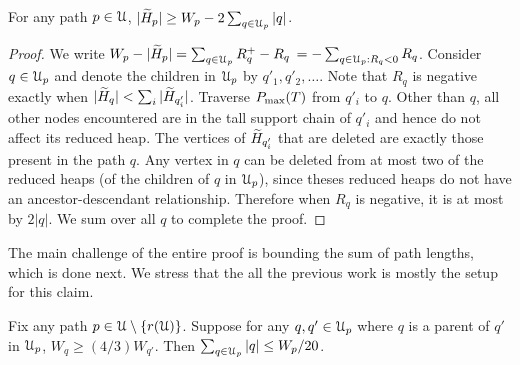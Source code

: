 {\begin{claim} \label{clm:loss} For any path $p\in {\cal U}$, $|\widetilde{H}_p| \geq W_p - 2\sum_{q \in {\cal U}_p} |q|$.
\end{claim}

\begin{proof} We write $W_p - |\widetilde{H}_p| = \sum_{q \in {\cal U}_p} R^+_q - R_q$ $= -\sum_{q \in {\cal U}_p: R_q < 0} R_q$.
Consider $q \in {\cal U}_p$ and denote the children in ${\cal U}_p$ by $q'_1, q'_2, \ldots$.
Note that $R_q$ is negative exactly when $|\widetilde{H}_q| < \sum_i |\widetilde{H}_{q'_i}|$.
Traverse $P_{\max}(T)$ from $q'_i$ to $q$.
Other than $q$, all other nodes encountered are in the tall support chain of $q'_i$ and hence
do not affect its reduced heap.
The vertices of $\widetilde{H}_{q'_i}$ that are deleted
are exactly those present in the path $q$. 
Any vertex in $q$ can be deleted from at most two of the reduced heaps (of the children of $q$ in ${\cal U}_p$), since 
theses reduced heaps do not have an ancestor-descendant relationship.
Therefore when $R_q$ is negative, it is at most by $2|q|$.
We sum over all $q$ to complete the proof.
\end{proof}



The main challenge of the entire proof is bounding the sum of path lengths, which is done next.
We stress that the all the previous work is mostly the setup for this claim.


\begin{claim} \label{clm:charge} Fix any path $p \in {\cal U}\setminus\{r({\cal U})\}$. Suppose for any $q,q' \in {\cal U}_p$
where $q$ is a parent of $q'$ in ${\cal U}_p$, $W_q \geq (4/3)W_{q'}$. Then $\sum_{q \in {\cal U}_p} |q| \leq W_p/20$.
\end{claim}

}
